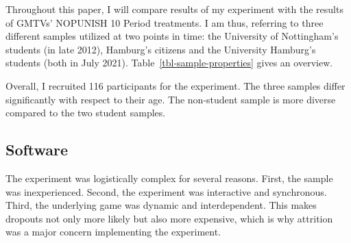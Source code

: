 \documentclass[
  authoryear,
  review,
  3p,
  onecolumn]{elsarticle}
\begin{document}
Throughout this paper, I will compare results of my experiment with the
results of GMTVs' NOPUNISH 10 Period treatments. I am thus, referring to
three different samples utilized at two points in time: the University
of Nottingham's students (in late 2012), Hamburg's citizens and the
University Hamburg's students (both in July 2021).
Table~\ref{tbl-sample-properties} gives an overview.

\hypertarget{tbl-sample-properties}{}
\begin{table}[!htbp] \centering \renewcommand*{\arraystretch}{1.1}\caption{\label{tbl-sample-properties}Sample Properties }
\end{table}

Overall, I recruited 116 participants for the experiment. The three
samples differ significantly with respect to their age. The non-student
sample is more diverse compared to the two student samples.

\hypertarget{sec-software}{%
\subsection{Software}\label{sec-software}}

The experiment was logistically complex for several reasons. First, the
sample was inexperienced. Second, the experiment was interactive and
synchronous. Third, the underlying game was dynamic and interdependent.
This makes dropouts not only more likely but also more expensive, which
is why attrition was a major concern implementing the experiment.
\end{document}
